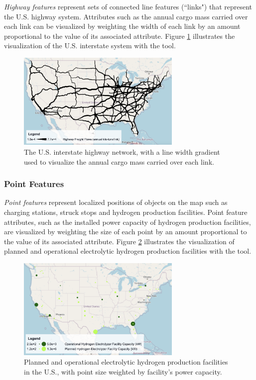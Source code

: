 \textit{Highway features} represent sets of connected line features (``links") that represent the U.S. highway system. Attributes such as the annual cargo mass carried over each link can be visualized by weighting the width of each link by an amount proportional to the value of its associated attribute. Figure \ref{fig:highway_flows} illustrates the visualization of the U.S. interstate system with the tool. 

\begin{figure}[ht]
        \centering
        \includegraphics[width=0.7\textwidth]{figures/highway_flows.png}
        \caption{The U.S. interstate highway network, with a line width gradient used to visualize the annual cargo mass carried over each link.}
        \label{fig:highway_flows}
\end{figure}

\subsubsection{Point Features}

\textit{Point features} represent localized positions of objects on the map such as charging stations, struck stops and hydrogen production facilities. Point feature attributes, such as the installed power capacity of hydrogen production facilities, are visualized by weighting the size of each point by an amount proportional to the value of its associated attribute. Figure \ref{fig:electrolyzer_facilities} illustrates the visualization of planned and operational electrolytic hydrogen production facilities with the tool. 

\begin{figure}[ht]
        \centering
        \includegraphics[width=0.7\textwidth]{figures/electrolyzer_facilities.png}
        \caption{Planned and operational electrolytic hydrogen production facilities in the U.S., with point size weighted by facility's power capacity.}
        \label{fig:electrolyzer_facilities}
\end{figure}

